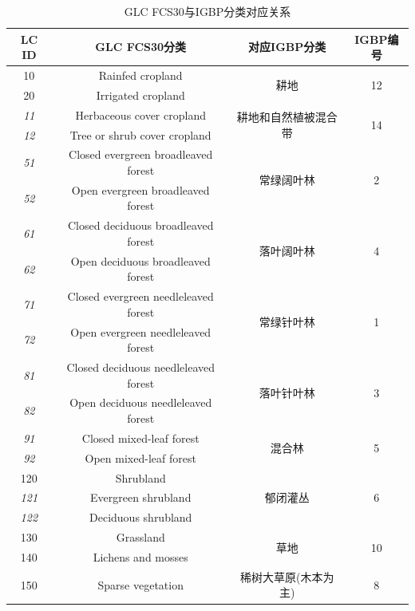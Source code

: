\begin{table}[htbp]
\fontsize{9.5}{9.5}\selectfont
\renewcommand\arraystretch{1.85}
\centering
\caption{GLC FCS30与IGBP分类对应关系}
\label{tab:GLC FCS30与IGBP分类对应关系}
\begin{tabular}{cccc}
\toprule
LC ID & GLC FCS30分类 & 对应IGBP分类 & IGBP编号 \\
%
\midrule
 10 & Rainfed cropland & \multirow{2}{*}{耕地} & \multirow{2}{*}{12} \\
  20 & Irrigated cropland & & \\
%
\cline{1-4}  \textit{11} & Herbaceous cover cropland & \multirow{2}{*}{耕地和自然植被混合带} & \multirow{2}{*}{14} \\
  \textit{12} & Tree or shrub cover cropland & & \\
%
\cline{1-4}  \textit{51} & Closed evergreen broadleaved forest & \multirow{2}{*}{常绿阔叶林} & \multirow{2}{*}{2} \\
  \textit{52} & Open evergreen broadleaved forest & & \\
%
\cline{1-4}  \textit{61} & Closed deciduous broadleaved forest & \multirow{2}{*}{落叶阔叶林} & \multirow{2}{*}{4} \\
  \textit{62} & Open deciduous broadleaved forest & & \\
%
\cline{1-4}  \textit{71} & Closed evergreen needleleaved forest & \multirow{2}{*}{常绿针叶林} & \multirow{2}{*}{1} \\
  \textit{72} & Open evergreen needleleaved forest & & \\
%
\cline{1-4}  \textit{81} & Closed deciduous needleleaved forest & \multirow{2}{*}{落叶针叶林} & \multirow{2}{*}{3} \\
  \textit{82} & Open deciduous needleleaved forest & & \\
%
\cline{1-4}  \textit{91} & Closed mixed-leaf forest & \multirow{2}{*}{混合林} & \multirow{2}{*}{5} \\
  \textit{92} & Open mixed-leaf forest & & \\
%
\cline{1-4} 120 & Shrubland & \multirow{3}{*}{郁闭灌丛} & \multirow{3}{*}{6} \\
 \textit{121} & Evergreen shrubland & & \\
 \textit{122} & Deciduous shrubland & & \\
%
\cline{1-4} 130 & Grassland & \multirow{2}{*}{草地} & \multirow{2}{*}{10} \\
 140 & Lichens and mosses & & \\
%
\cline{1-4} 150 & Sparse vegetation & 稀树大草原(木本为主) & 8 \\

\end{tabular}
\end{table}
